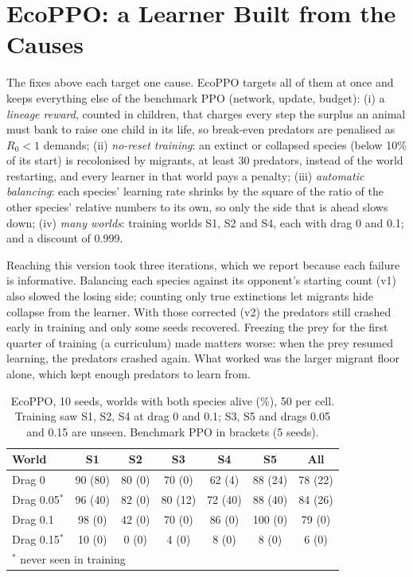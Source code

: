 \documentclass[conference]{IEEEtran}
\begin{document}
\section{EcoPPO: a Learner Built from the Causes}
\label{sec:ecoppo}
The fixes above each target one cause. EcoPPO targets all of them at once and keeps everything else of the benchmark PPO (network, update, budget):
(i) a \emph{lineage reward}, counted in children, that charges every step the surplus an animal must bank to raise one child in its life, so break-even predators are penalised as $R_0<1$ demands;
(ii) \emph{no-reset training}: an extinct or collapsed species (below 10\% of its start) is recolonised by migrants, at least 30 predators, instead of the world restarting, and every learner in that world pays a penalty;
(iii) \emph{automatic balancing}: each species' learning rate shrinks by the square of the ratio of the other species' relative numbers to its own, so only the side that is ahead slows down;
(iv) \emph{many worlds}: training worlds S1, S2 and S4, each with drag 0 and 0.1; and a discount of 0.999.

Reaching this version took three iterations, which we report because each failure is informative. Balancing each species against its opponent's starting count (v1) also slowed the losing side; counting only true extinctions let migrants hide collapse from the learner. With those corrected (v2) the predators still crashed early in training and only some seeds recovered. Freezing the prey for the first quarter of training (a curriculum) made matters worse: when the prey resumed learning, the predators crashed again. What worked was the larger migrant floor alone, which kept enough predators to learn from.

\begin{table}[t]
\centering
\caption{EcoPPO, 10 seeds, worlds with both species alive (\%), 50 per cell. Training saw S1, S2, S4 at drag 0 and 0.1; S3, S5 and drags 0.05 and 0.15 are unseen. Benchmark PPO in brackets (5 seeds).}
\label{tab:ecoppo}
\setlength{\tabcolsep}{4.5pt}
\begin{tabular}{lcccccc}
\toprule
World & S1 & S2 & S3 & S4 & S5 & All \\
\midrule
Drag 0 & 90 (80) & 80 (0) & 70 (0) & 62 (4) & 88 (24) & 78 (22) \\
Drag 0.05$^\ast$ & 96 (40) & 82 (0) & 80 (12) & 72 (40) & 88 (40) & 84 (26) \\
Drag 0.1 & 98 (0) & 42 (0) & 70 (0) & 86 (0) & 100 (0) & 79 (0) \\
Drag 0.15$^\ast$ & 10 (0) & 0 (0) & 4 (0) & 8 (0) & 8 (0) & 6 (0) \\
\bottomrule
\multicolumn{7}{l}{\footnotesize $^\ast$ never seen in training}
\end{tabular}
\end{table}
\end{document}

